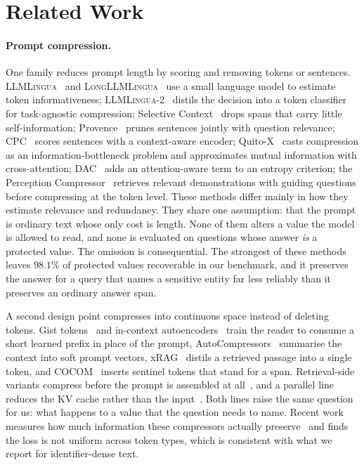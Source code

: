 \section{Related Work}
\label{sec:related}

\paragraph{Prompt compression.}
One family reduces prompt length by scoring and removing tokens or sentences. \textsc{LLMLingua}~\cite{llmlingua} and \textsc{LongLLMLingua}~\cite{longllmlingua}
use a small language model to estimate token informativeness; \textsc{LLMLingua-2}~\cite{llmlingua2}
distils the decision into a token classifier for task-agnostic compression;
Selective Context~\cite{selective_context} drops spans that carry little
self-information; Provence~\cite{provence} prunes sentences jointly with question
relevance; CPC~\cite{cpc} scores sentences with a context-aware encoder;
Quito-X~\cite{quitox} casts compression as an information-bottleneck problem and
approximates mutual information with cross-attention; DAC~\cite{dac} adds an
attention-aware term to an entropy criterion; the Perception
Compressor~\cite{perception_compressor} retrieves relevant demonstrations with guiding
questions before compressing at the token level. These methods differ mainly in how they
estimate relevance and redundancy. They share one assumption: that the prompt is ordinary
text whose only cost is length. None of them alters a value the model is allowed to read,
and none is evaluated on questions whose answer \emph{is} a protected value. The omission is
consequential. The strongest of these methods leaves $98.1\%$ of protected values
recoverable in our benchmark, and it preserves the answer for a query that names a sensitive
entity far less reliably than it preserves an ordinary answer span.

A second design point compresses into continuous space instead of deleting tokens. Gist
tokens~\cite{mu-gist-2023} and in-context autoencoders~\cite{ge-icae-2024} train the reader to
consume a short learned prefix in place of the prompt, AutoCompressors~\cite{chevalier-autocomp-2023}
summarise the context into soft prompt vectors, xRAG~\cite{cheng-xrag-2024} distils a retrieved
passage into a single token, and COCOM~\cite{ren-cocom-2023} inserts sentinel tokens that stand
for a span. Retrieval-side variants compress before the prompt is assembled at
all~\cite{xu-recomp-2024,liu-tcra-2023}, and a parallel line reduces the KV cache rather than the
input~\cite{zhang-h2o-2023,li-snapkv-2024}. Both lines raise the same question for us: what
happens to a value that the question needs to name. Recent work measures how much information
these compressors actually preserve~\cite{lajewska-infopres-2025} and finds the loss is not
uniform across token types, which is consistent with what we report for identifier-dense text.

